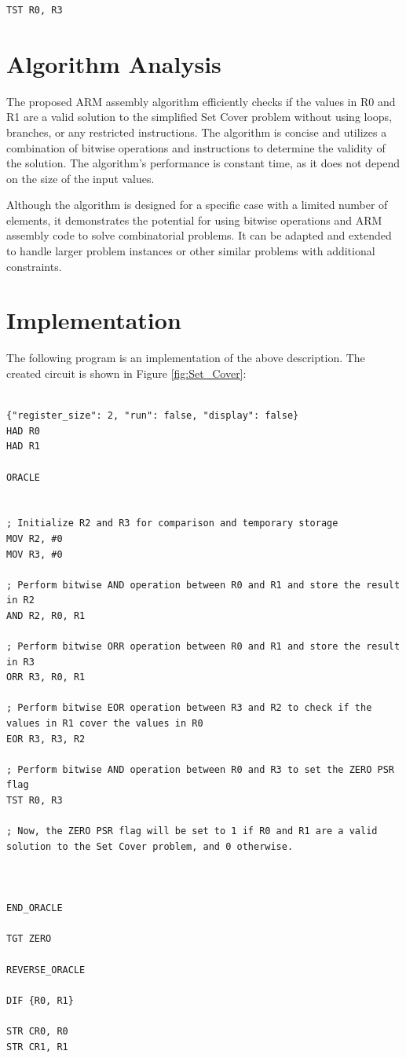 \begin{verbatim}
TST R0, R3
\end{verbatim}

\section{Algorithm Analysis}
The proposed ARM assembly algorithm efficiently checks if the values in R0 and R1 are a valid solution to the simplified Set Cover problem without using loops, branches, or any restricted instructions. The algorithm is concise and utilizes a combination of bitwise operations and instructions to determine the validity of the solution. The algorithm's performance is constant time, as it does not depend on the size of the input values.

Although the algorithm is designed for a specific case with a limited number of elements, it demonstrates the potential for using bitwise operations and ARM assembly code to solve combinatorial problems. It can be adapted and extended to handle larger problem instances or other similar problems with additional constraints.



\section{Implementation}

The following program is an implementation of the above description. The created circuit is shown in Figure \ref{fig:Set_Cover}:

\begin{lstlisting}

{"register_size": 2, "run": false, "display": false}
HAD R0
HAD R1

ORACLE


; Initialize R2 and R3 for comparison and temporary storage
MOV R2, #0
MOV R3, #0

; Perform bitwise AND operation between R0 and R1 and store the result in R2
AND R2, R0, R1

; Perform bitwise ORR operation between R0 and R1 and store the result in R3
ORR R3, R0, R1

; Perform bitwise EOR operation between R3 and R2 to check if the values in R1 cover the values in R0
EOR R3, R3, R2

; Perform bitwise AND operation between R0 and R3 to set the ZERO PSR flag
TST R0, R3

; Now, the ZERO PSR flag will be set to 1 if R0 and R1 are a valid solution to the Set Cover problem, and 0 otherwise.



END_ORACLE

TGT ZERO

REVERSE_ORACLE

DIF {R0, R1}

STR CR0, R0
STR CR1, R1


\end{lstlisting}

